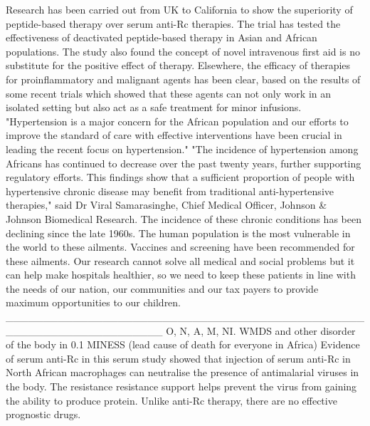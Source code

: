 \documentclass{article}%
\begin{document}
Research has been carried out from UK to California to show the superiority of peptide{-}based therapy over serum anti{-}Rc therapies.\newline%
The trial has tested the effectiveness of deactivated peptide{-}based therapy in Asian and African populations. The study also found the concept of novel intravenous first aid is no substitute for the positive effect of therapy.\newline%
Elsewhere, the efficacy of therapies for proinflammatory and malignant agents has been clear, based on the results of some recent trials which showed that these agents can not only work in an isolated setting but also act as a safe treatment for minor infusions.\newline%
"Hypertension is a major concern for the African population and our efforts to improve the standard of care with effective interventions have been crucial in leading the recent focus on hypertension."\newline%
"The incidence of hypertension among Africans has continued to decrease over the past twenty years, further supporting regulatory efforts. This findings show that a sufficient proportion of people with hypertensive chronic disease may benefit from traditional anti{-}hypertensive therapies," said Dr Viral Samarasinghe, Chief Medical Officer, Johnson \& Johnson Biomedical Research.\newline%
The incidence of these chronic conditions has been declining since the late 1960s. The human population is the most vulnerable in the world to these ailments. Vaccines and screening have been recommended for these ailments.\newline%
Our research cannot solve all medical and social problems but it can help make hospitals healthier, so we need to keep these patients in line with the needs of our nation, our communities and our tax payers to provide maximum opportunities to our children.\newline%
\_\_\_\_\_\_\_\_\_\_\_\_\_\_\_\_\_\_\_\_\_\_\_\_\_\_\_\_\_\_\_\_\_\_\_\_\_\_\_\_\_\_\_\_\_\_\_\_\_\_\_\_\_\_\_\_\_\_\_\_\_\_\_\_\_\_\_\_\_\newline%
O, N, A, M, NI. WMDS and other disorder of the body in 0.1 MINESS (lead cause of death for everyone in Africa) Evidence of serum anti{-}Rc in this serum study showed that injection of serum anti{-}Rc in North African macrophages can neutralise the presence of antimalarial viruses in the body.\newline%
The resistance resistance support helps prevent the virus from gaining the ability to produce protein. Unlike anti{-}Rc therapy, there are no effective prognostic drugs.\newline%
\end{document}
